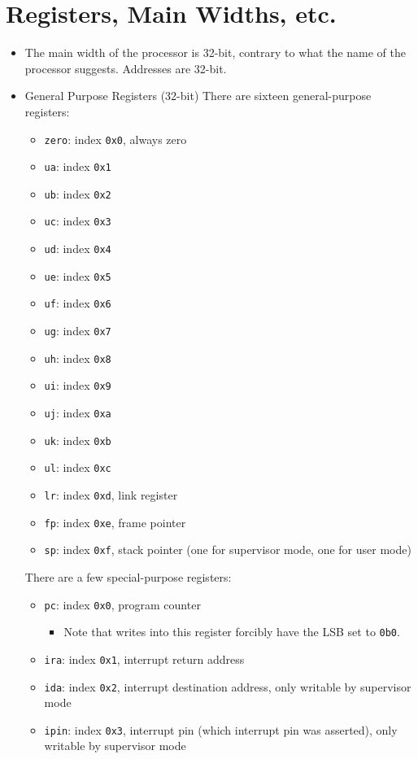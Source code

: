 \documentclass{article}
\begin{document}
\section{Registers, Main Widths, etc.}
	\begin{itemize}
	\item The main width of the processor is 32-bit, contrary to what the
		name of the processor suggests.  Addresses are 32-bit. 
	\item General Purpose Registers (32-bit)
		There are sixteen general-purpose registers:
		\begin{itemize}
		\item \texttt{zero}: index \texttt{0x0}, always zero
		\item \texttt{ua}: index \texttt{0x1}
		\item \texttt{ub}: index \texttt{0x2}
		\item \texttt{uc}: index \texttt{0x3}
		\item \texttt{ud}: index \texttt{0x4}
		\item \texttt{ue}: index \texttt{0x5}
		\item \texttt{uf}: index \texttt{0x6}
		\item \texttt{ug}: index \texttt{0x7}
		\item \texttt{uh}: index \texttt{0x8}
		\item \texttt{ui}: index \texttt{0x9}
		\item \texttt{uj}: index \texttt{0xa}
		\item \texttt{uk}: index \texttt{0xb}
		\item \texttt{ul}: index \texttt{0xc}
		\item \texttt{lr}: index \texttt{0xd}, link register
		\item \texttt{fp}: index \texttt{0xe}, frame pointer
		\item \texttt{sp}: index \texttt{0xf}, stack pointer (one for
			supervisor mode, one for user mode)
		\end{itemize}

		There are a few special-purpose registers:
		\begin{itemize}
		\item \texttt{pc}: index \texttt{0x0}, program counter
			\begin{itemize}
			\item Note that writes into this register forcibly have the LSB
				set to \texttt{0b0}.
			\end{itemize}
		\item \texttt{ira}: index \texttt{0x1}, interrupt return address
		\item \texttt{ida}: index \texttt{0x2}, interrupt destination
			address, only writable by supervisor mode
		\item \texttt{ipin}: index \texttt{0x3}, interrupt pin (which
			interrupt pin was asserted), only writable by supervisor mode


\end{itemize}
\end{itemize}
\end{document}
